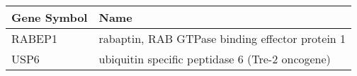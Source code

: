 \begin{tabular}{ll}
\toprule
Gene Symbol &                                            Name \\
\midrule
     RABEP1 & rabaptin, RAB GTPase binding effector protein 1 \\
       USP6 & ubiquitin specific peptidase 6 (Tre-2 oncogene) \\
\bottomrule
\end{tabular}
